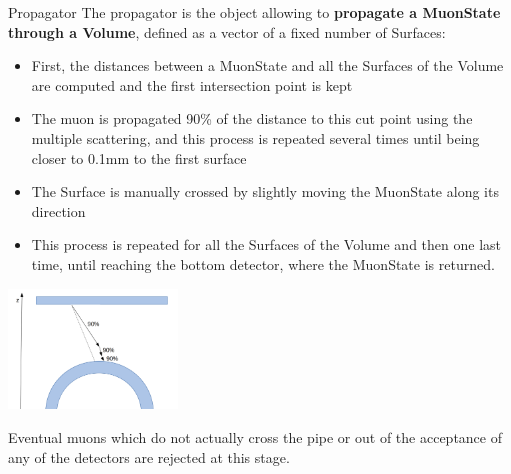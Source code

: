 \documentclass[8 pt]{beamer}
\begin{document}
\begin{frame}{Propagator}
\justifying
The propagator is the object allowing to \textbf{propagate a MuonState through a Volume}, defined as a vector of a fixed number of Surfaces: \vfill

\begin{minipage}[c]{.59\textwidth}
\begin{itemize}
\justifying
\item First, the distances between a MuonState and all the Surfaces of the Volume are computed and the first intersection point is kept
\item The muon is propagated 90\% of the distance to this cut point using the multiple scattering, and this process is repeated several times until being closer to 0.1mm to the first surface
\item The Surface is manually crossed by slightly moving the MuonState along its direction
\item This process is repeated for all the Surfaces of the Volume and then one last time, until reaching the bottom detector, where the MuonState is returned.
\end{itemize}
\end{minipage}
\begin{minipage}[c]{.40\textwidth}
\includegraphics[width=4.5cm, height=3.2cm]{figs/propagation.png}
\end{minipage} \vfill

Eventual muons which do not actually cross the pipe or out of the acceptance of any of the detectors are rejected at this stage. \vfill
\end{frame}
\end{document}

